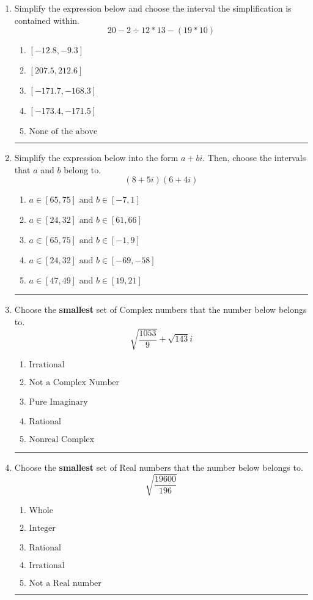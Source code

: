 \documentclass[14pt]{extbook}
\newcommand{\litem}[1]{\item#1\hspace*{-1cm}\rule{\textwidth}{0.4pt}}
\begin{document}
\begin{enumerate}
\litem{
Simplify the expression below and choose the interval the simplification is contained within.\[ 20 - 2 \div 12 * 13 - (19 * 10) \]\begin{enumerate}[label=\Alph*.]
\item \( [-12.8, -9.3] \)
\item \( [207.5, 212.6] \)
\item \( [-171.7, -168.3] \)
\item \( [-173.4, -171.5] \)
\item \( \text{None of the above} \)

\end{enumerate} }
\litem{
Simplify the expression below into the form $a+bi$. Then, choose the intervals that $a$ and $b$ belong to.\[ (8 + 5 i)(6 + 4 i) \]\begin{enumerate}[label=\Alph*.]
\item \( a \in [65, 75] \text{ and } b \in [-7, 1] \)
\item \( a \in [24, 32] \text{ and } b \in [61, 66] \)
\item \( a \in [65, 75] \text{ and } b \in [-1, 9] \)
\item \( a \in [24, 32] \text{ and } b \in [-69, -58] \)
\item \( a \in [47, 49] \text{ and } b \in [19, 21] \)

\end{enumerate} }
\litem{
Choose the \textbf{smallest} set of Complex numbers that the number below belongs to.\[ \sqrt{\frac{1053}{9}}+\sqrt{143} i \]\begin{enumerate}[label=\Alph*.]
\item \( \text{Irrational} \)
\item \( \text{Not a Complex Number} \)
\item \( \text{Pure Imaginary} \)
\item \( \text{Rational} \)
\item \( \text{Nonreal Complex} \)

\end{enumerate} }
\litem{
Choose the \textbf{smallest} set of Real numbers that the number below belongs to.\[ \sqrt{\frac{19600}{196}} \]\begin{enumerate}[label=\Alph*.]
\item \( \text{Whole} \)
\item \( \text{Integer} \)
\item \( \text{Rational} \)
\item \( \text{Irrational} \)
\item \( \text{Not a Real number} \)


\end{enumerate}}
\end{enumerate}
\end{document}
